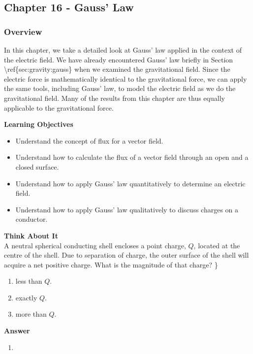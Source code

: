 \subsection{Chapter 16 - Gauss' Law}

\subsubsection{Overview}\label{chapter:gauss}

In this chapter, we take a detailed look at Gauss' law applied in the context of the electric field. We have already encountered Gauss' law briefly in Section {\textbackslash}ref\{sec:gravity:gauss\} when we examined the gravitational field. Since the electric force is mathematically identical to the gravitational force, we can apply the same tools, including Gauss' law, to model the electric field as we do the gravitational field. Many of the results from this chapter are thus equally applicable to the gravitational force.

\begin{framed}
\textbf{Learning Objectives}\\
\begin{itemize}
\item Understand the concept of flux for a vector field.
\item Understand how to calculate the flux of a vector field through an open and a closed surface.
\item Understand how to apply Gauss' law quantitatively to determine an electric field.
\item Understand how to apply Gauss' law qualitatively to discuss charges on a conductor.
\end{itemize}
\end{framed}

\begin{framed}
\textbf{Think About It}\\
A neutral spherical conducting shell encloses a point charge, $Q$, located at the centre of the shell. Due to separation of charge, the outer surface of the shell will acquire a net positive charge. What is the magnitude of that charge? \}

\begin{enumerate}
\item less than $Q$.
\item exactly $Q$.
\item more than $Q$.
\end{enumerate}

\begin{framed}
\textbf{Answer}\\
\begin{enumerate}[resume]
\item
\end{enumerate}
\end{framed}
\end{framed}

